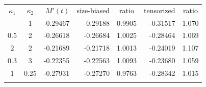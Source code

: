 \begin{tabular}{@{}ccrrcrc@{}}
\toprule
$\kappa_1$ & $\kappa_2$ & $M'(t)$ & size-biased & ratio & tensorized & ratio \\
\colrule
1 & 1 & -0.29467 & -0.29188 & 0.9905 & -0.31517 & 1.070 \\
0.5 & 2 & -0.26618 & -0.26684 & 1.0025 & -0.28464 & 1.069 \\
2 & 2 & -0.21689 & -0.21718 & 1.0013 & -0.24019 & 1.107 \\
0.3 & 3 & -0.22355 & -0.22563 & 1.0093 & -0.23680 & 1.059 \\
1 & 0.25 & -0.27931 & -0.27270 & 0.9763 & -0.28342 & 1.015 \\
\botrule
\end{tabular}